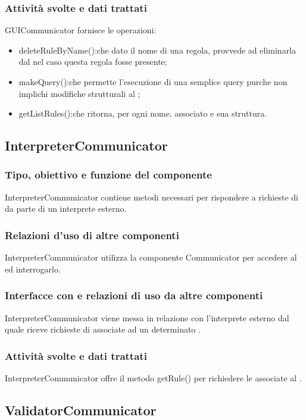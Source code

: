 \documentclass[11pt,titlepage,a4paper]{report}
\begin{document}
\subsubsection{Attivit\`a svolte e dati trattati}
GUICommunicator fornisce le operazioni:
\begin{itemize}
 \item deleteRuleByName():che dato il nome di una regola, provvede ad eliminarla dal \re nel caso questa regola fosse presente;
 \item makeQuery():che permette l'esecuzione di una semplice query purche non implichi modifiche strutturali al \re;
 \item getListRules():che ritorna, per ogni \br nome, \bo associato e sua struttura.
\end{itemize}
\subsection{InterpreterCommunicator}
\subsubsection{Tipo, obiettivo e funzione del componente}
InterpreterCommunicator contiene metodi necessari per rispondere a richieste di \br da parte di un interprete esterno.
\subsubsection{Relazioni d'uso di altre componenti}
InterpreterCommunicator utilizza la componente Communicator per accedere al \re ed interrogarlo.
\subsubsection{Interfacce con e relazioni di uso da altre componenti}
InterpreterCommunicator viene messa in relazione con l'interprete esterno dal quale riceve richieste di \brs associate ad un determinato \bo.
\subsubsection{Attivit\`a svolte e dati trattati}
InterpreterCommunicator offre il metodo getRule() per richiedere le \br associate al \bo.

\subsection{ValidatorCommunicator}
\end{document}
